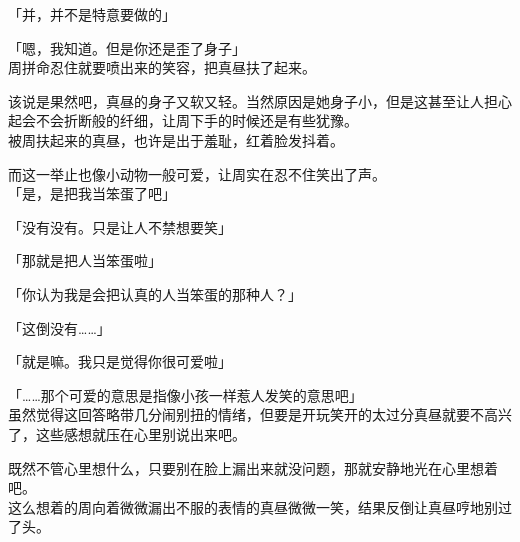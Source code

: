 「并，并不是特意要做的」

「嗯，我知道。但是你还是歪了身子」\\

周拼命忍住就要喷出来的笑容，把真昼扶了起来。

该说是果然吧，真昼的身子又软又轻。当然原因是她身子小，但是这甚至让人担心起会不会折断般的纤细，让周下手的时候还是有些犹豫。\\

被周扶起来的真昼，也许是出于羞耻，红着脸发抖着。

而这一举止也像小动物一般可爱，让周实在忍不住笑出了声。\\

「是，是把我当笨蛋了吧」

「没有没有。只是让人不禁想要笑」

「那就是把人当笨蛋啦」

「你认为我是会把认真的人当笨蛋的那种人？」

「这倒没有……」

「就是嘛。我只是觉得你很可爱啦」

「……那个可爱的意思是指像小孩一样惹人发笑的意思吧」\\

虽然觉得这回答略带几分闹别扭的情绪，但要是开玩笑开的太过分真昼就要不高兴了，这些感想就压在心里别说出来吧。

既然不管心里想什么，只要别在脸上漏出来就没问题，那就安静地光在心里想着吧。\\

这么想着的周向着微微漏出不服的表情的真昼微微一笑，结果反倒让真昼哼地别过了头。

